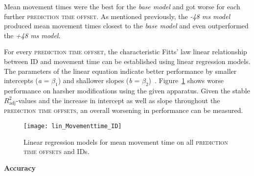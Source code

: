 \documentclass[sigconf]{acmart}
\begin{document}
Mean movement times were the best for the \textit{base model} and got worse for each further \textsc{prediction time offset}. As mentioned previously, the \textit{-48 ms model} produced mean movement times closest to the \textit{base model} and even outperformed the \textit{+48 ms model}.

For every \textsc{prediction time offset}, the characteristic Fitts' law linear relationship between ID and movement time can be established using linear regression models. The parameters of the linear equation indicate better performance by smaller intercepts (\textit{a} = $\beta_1$) and shallower slopes (\textit{b} = $\beta_2$)~\cite{Law2018}. Figure~\ref{fig:lin_MovementTime} shows worse performance on harsher modifications using the given apparatus. Given the stable $R^2_\text{adj}$-values and the increase in intercept as well as slope throughout the \textsc{prediction time offsets}, an overall worsening in performance can be measured.

 
\begin{figure}[H]
  \centering
  \texttt{[image: lin\_Movementtime\_ID]}
  \caption{Linear regression models for mean movement time on all \textsc{prediction time offsets} and IDs.}
 \label{fig:lin_MovementTime}
\end{figure}

\textbf{Accuracy}
\end{document}
